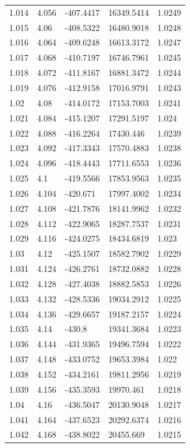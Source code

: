 \begin{tabular}{lllll}
1.014 & 4.056 & -407.4417 & 16349.5414 & 1.0249 \\
1.015 & 4.06 & -408.5322 & 16480.9018 & 1.0248 \\
1.016 & 4.064 & -409.6248 & 16613.3172 & 1.0247 \\
1.017 & 4.068 & -410.7197 & 16746.7961 & 1.0245 \\
1.018 & 4.072 & -411.8167 & 16881.3472 & 1.0244 \\
1.019 & 4.076 & -412.9158 & 17016.9791 & 1.0243 \\
1.02 & 4.08 & -414.0172 & 17153.7003 & 1.0241 \\
1.021 & 4.084 & -415.1207 & 17291.5197 & 1.024 \\
1.022 & 4.088 & -416.2264 & 17430.446 & 1.0239 \\
1.023 & 4.092 & -417.3343 & 17570.4883 & 1.0238 \\
1.024 & 4.096 & -418.4443 & 17711.6553 & 1.0236 \\
1.025 & 4.1 & -419.5566 & 17853.9563 & 1.0235 \\
1.026 & 4.104 & -420.671 & 17997.4002 & 1.0234 \\
1.027 & 4.108 & -421.7876 & 18141.9962 & 1.0232 \\
1.028 & 4.112 & -422.9065 & 18287.7537 & 1.0231 \\
1.029 & 4.116 & -424.0275 & 18434.6819 & 1.023 \\
1.03 & 4.12 & -425.1507 & 18582.7902 & 1.0229 \\
1.031 & 4.124 & -426.2761 & 18732.0882 & 1.0228 \\
1.032 & 4.128 & -427.4038 & 18882.5853 & 1.0226 \\
1.033 & 4.132 & -428.5336 & 19034.2912 & 1.0225 \\
1.034 & 4.136 & -429.6657 & 19187.2157 & 1.0224 \\
1.035 & 4.14 & -430.8 & 19341.3684 & 1.0223 \\
1.036 & 4.144 & -431.9365 & 19496.7594 & 1.0222 \\
1.037 & 4.148 & -433.0752 & 19653.3984 & 1.022 \\
1.038 & 4.152 & -434.2161 & 19811.2956 & 1.0219 \\
1.039 & 4.156 & -435.3593 & 19970.461 & 1.0218 \\
1.04 & 4.16 & -436.5047 & 20130.9048 & 1.0217 \\
1.041 & 4.164 & -437.6523 & 20292.6374 & 1.0216 \\
1.042 & 4.168 & -438.8022 & 20455.669 & 1.0215 \\

\end{tabular}
